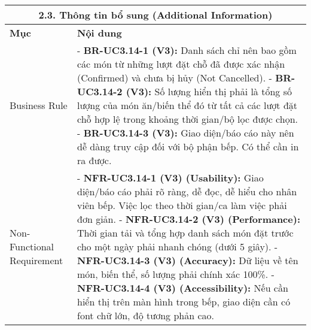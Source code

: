 \begin{longtable}{|m{4cm}|p{11cm}|}
\hline
\multicolumn{2}{|c|}{\textbf{2.3. Thông tin bổ sung (Additional Information)}} \\
\hline
\textbf{Mục} & \textbf{Nội dung} \\
\hline
Business Rule & - \textbf{BR-UC3.14-1 (V3):} Danh sách chỉ nên bao gồm các món từ những lượt đặt chỗ đã được xác nhận (Confirmed) và chưa bị hủy (Not Cancelled). \newline - \textbf{BR-UC3.14-2 (V3):} Số lượng hiển thị phải là tổng số lượng của món ăn/biến thể đó từ tất cả các lượt đặt chỗ hợp lệ trong khoảng thời gian/bộ lọc được chọn. \newline - \textbf{BR-UC3.14-3 (V3):} Giao diện/báo cáo này nên dễ dàng truy cập đối với bộ phận bếp. Có thể cần in ra được. \\
\hline
Non-Functional Requirement & - \textbf{NFR-UC3.14-1 (V3) (Usability):} Giao diện/báo cáo phải rõ ràng, dễ đọc, dễ hiểu cho nhân viên bếp. Việc lọc theo thời gian/ca làm việc phải đơn giản. \newline - \textbf{NFR-UC3.14-2 (V3) (Performance):} Thời gian tải và tổng hợp danh sách món đặt trước cho một ngày phải nhanh chóng (dưới 5 giây). \newline - \textbf{NFR-UC3.14-3 (V3) (Accuracy):} Dữ liệu về tên món, biến thể, số lượng phải chính xác 100\%. \newline - \textbf{NFR-UC3.14-4 (V3) (Accessibility):} Nếu cần hiển thị trên màn hình trong bếp, giao diện cần có font chữ lớn, độ tương phản cao. \\
\hline
\end{longtable}

